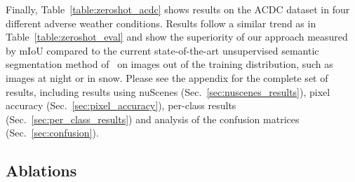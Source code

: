 \documentclass[runningheads]{llncs}
\newcommand{\supp}{appendix\xspace}
\begin{document}
Finally, Table~\ref{table:zeroshot_acdc} shows results on the ACDC dataset in four different adverse weather conditions. Results follow a similar trend as in Table~\ref{table:zeroshot_eval} and show the superiority of our approach measured by mIoU compared
to the current state-of-the-art unsupervised semantic segmentation method of~\cite{cho2021picie} on images out of the training distribution, such as images at night or in snow. Please see the 
\supp
for the complete set of results, including results using nuScenes (Sec.~\ref{sec:nuscenes_results}), pixel accuracy (Sec.~\ref{sec:pixel_accuracy}), per-class results (Sec.~\ref{sec:per_class_results}) and analysis of the confusion matrices (Sec.~\ref{sec:confusion}).


\vspace{-5pt}
\subsection{Ablations}
\label{sec:ablations}
\end{document}
